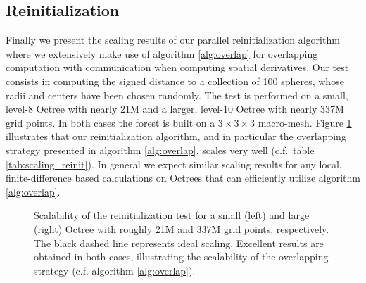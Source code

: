 \subsection{Reinitialization} \label{section::scaling_reinitialization}

Finally we present the scaling results of our parallel reinitialization algorithm where we extensively make use of algorithm \ref{alg:overlap} for overlapping computation with communication when computing spatial derivatives. Our test consists in computing the signed distance to a collection of 100 spheres, whose radii and centers have been chosen randomly. The test is performed on a small, level-8 Octree with nearly 21M and a larger, level-10 Octree with nearly 337M grid points. In both cases the forest is built on a $3\times3\times3$ macro-mesh. Figure \ref{fig:reinit} illustrates that our reinitialization algorithm, and in particular the overlapping strategy presented in algorithm \ref{alg:overlap}, scales very well (c.f.\ table \ref{tab:scaling_reinit}). In general we expect similar scaling results for any local, finite-difference based calculations on Octrees that can efficiently utilize algorithm \ref{alg:overlap}. 
\begin{figure}
\centering
{}
\caption{Scalability of the reinitialization test for a small (left) and large (right) Octree with roughly 21M and 337M grid points, respectively. The black dashed line represents ideal scaling. Excellent results are obtained in both cases, illustrating the scalability of the overlapping strategy (c.f. algorithm \ref{alg:overlap}).}
\label{fig:reinit}
\end{figure}

